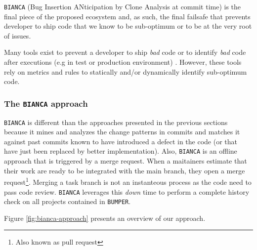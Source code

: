 

{\tt BIANCA} (Bug Insertion ANticipation by Clone Analysis at commit time) is the final piece of the proposed ecosystem and, as such, the final failsafe that prevents developer to ship code that we know to be sub-optimum or to be at the very root of issues.

Many tools exist to prevent a developer to ship {\it bad} code \cite{Dangel2000,Hovemeyer2007,Moha2010} or to identify {\it bad} code after executions (e.g in test or production environment) \cite{Nayrolles,Nayrolles2013a}.
However, these tools rely on metrics and rules to statically and/or dynamically identify sub-optimum code.

\subsubsection{The {\tt BIANCA} approach\label{sec:bianca-approach}}

{\tt BIANCA} is different than the approaches presented in the previous sections  because it mines and analyzes the change patterns in commits and matches it against past commits known to have introduced a defect in the code (or that have just been replaced by better implementation).
Also, {\tt BIANCA} is an offline approach that is triggered by a merge request.
When a maitainers estimate that their work are ready to be integrated with the main branch, they open a merge request\footnote{Also known as pull request}.
Merging a task branch is not an instanteous process as the code need to pass code review.
{\tt BIANCA} leverages this {\it down} time to perform a complete history check on all projects contained in {\tt BUMPER}. 

Figure \ref{fig:bianca-approach} presents an overview of our approach.

